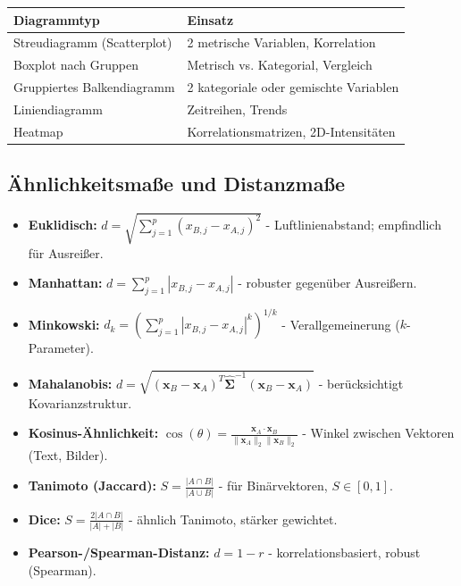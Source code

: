 \begin{center}
    \small
    \begin{tabular}{|l|l|}
        \hline
        \textbf{Diagrammtyp}        & \textbf{Einsatz}                       \\
        \hline
        Streudiagramm (Scatterplot) & 2 metrische Variablen, Korrelation     \\
        \hline
        Boxplot nach Gruppen        & Metrisch vs. Kategorial, Vergleich     \\
        \hline
        Gruppiertes Balkendiagramm  & 2 kategoriale oder gemischte Variablen \\
        \hline
        Liniendiagramm              & Zeitreihen, Trends                     \\
        \hline
        Heatmap                     & Korrelationsmatrizen, 2D-Intensitäten  \\
        \hline
    \end{tabular}
\end{center}

\newpage

\subsection{Ähnlichkeitsmaße und Distanzmaße}


\begin{itemize}[leftmargin=1.5em]
    \item \textbf{Euklidisch:} $d = \sqrt{\sum_{j=1}^{p}(x_{B,j}-x_{A,j})^2}$ - Luftlinienabstand; empfindlich für Ausreißer.
    \item \textbf{Manhattan:} $d = \sum_{j=1}^{p}|x_{B,j}-x_{A,j}|$ - robuster gegenüber Ausreißern.
    \item \textbf{Minkowski:} $d_k = \left(\sum_{j=1}^{p}|x_{B,j}-x_{A,j}|^k\right)^{1/k}$ - Verallgemeinerung ($k$-Parameter).
    \item \textbf{Mahalanobis:} $d = \sqrt{(\mathbf{x}_B-\mathbf{x}_A)^T\hat{\boldsymbol{\Sigma}}^{-1}(\mathbf{x}_B-\mathbf{x}_A)}$ - berücksichtigt Kovarianzstruktur.
\end{itemize}

\begin{itemize}[leftmargin=1.5em]
    \item \textbf{Kosinus-Ähnlichkeit:} $\cos(\theta) = \frac{\mathbf{x}_A \cdot \mathbf{x}_B}{\|\mathbf{x}_A\|_2\|\mathbf{x}_B\|_2}$ - Winkel zwischen Vektoren (Text, Bilder).
    \item \textbf{Tanimoto (Jaccard):} $S = \frac{|A \cap B|}{|A \cup B|}$ - für Binärvektoren, $S \in [0,1]$.
    \item \textbf{Dice:} $S = \frac{2|A \cap B|}{|A|+|B|}$ - ähnlich Tanimoto, stärker gewichtet.
    \item \textbf{Pearson-/Spearman-Distanz:} $d = 1-r$ - korrelationsbasiert, robust (Spearman).
\end{itemize}

